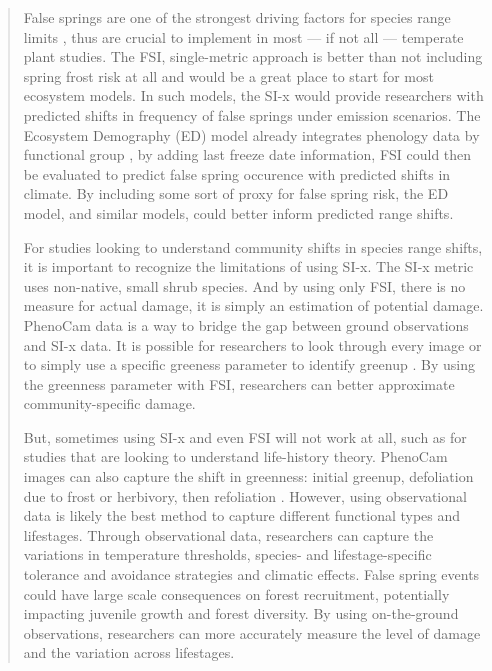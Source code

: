 \documentclass[11pt,a4paper]{article}
\begin{document}
\begin{quotation}
False springs are one of the strongest driving factors for species range limits \citep{Sakai1987}, thus are crucial to implement in most --- if not all --- temperate plant studies. The FSI, single-metric approach is better than not including spring frost risk at all and would be a great place to start for most ecosystem models. In such models, the SI-x would provide researchers with predicted shifts in frequency of false springs under emission scenarios. The Ecosystem Demography (ED) model already integrates phenology data by functional group \citep{Kim2015, Moorcroft2001}, by adding last freeze date information, FSI could then be evaluated to predict false spring occurence with predicted shifts in climate. By including some sort of proxy for false spring risk, the ED model, and similar models, could better inform predicted range shifts. 


For studies looking to understand community shifts in species range shifts, it is important to recognize the limitations of using SI-x. The SI-x metric uses non-native, small shrub species. And by using only FSI, there is no measure for actual damage, it is simply an estimation of potential damage. PhenoCam data is a way to bridge the gap between ground observations and SI-x data. It is possible for researchers to look through every image or to simply use a specific greeness parameter to identify greenup \citep{Richardson2018}. By using the greenness parameter with FSI, researchers can better approximate community-specific damage. 

But, sometimes using SI-x and even FSI will not work at all, such as for studies that are looking to understand life-history theory. PhenoCam images can also capture the shift in greenness: initial greenup, defoliation due to frost or herbivory, then refoliation \citep{Richardson2018b}. However, using observational data is likely the best method to capture different functional types and lifestages. Through observational data, researchers can capture the variations in temperature thresholds, species- and lifestage-specific tolerance and avoidance strategies and climatic effects. False spring events could have large scale consequences on forest recruitment, potentially impacting juvenile growth and forest diversity. By using on-the-ground observations, researchers can more accurately measure the level of damage and the variation across lifestages.
\end{quotation}
\end{document}
